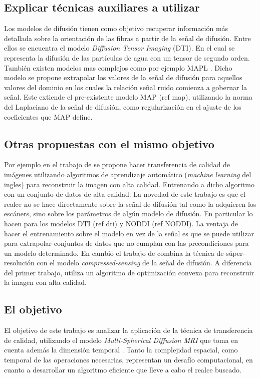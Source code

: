 \documentclass[a4paper,10pt]{article}
\begin{document}
\subsection{Explicar técnicas auxiliares a utilizar}
Los modelos de difusión tienen como objetivo recuperar información más detallada sobre la orientación de las fibras a 
partir de la señal de difusión. Entre ellos se encuentra el modelo \textit{Diffusion Tensor Imaging} (DTI). En el cual 
se representa la difusión de las partículas de agua con un tensor de segundo orden. También existen modelos mas 
complejos como por ejemplo MAPL \citep{Fick2016365}. Dicho modelo se propone extrapolar los 
valores de la se\~nal de difusión para aquellos valores del dominio en los cuales la relaci\'on 
se\~nal ruido comienza a gobernar la se\~nal. Este extiende el pre-existente modelo MAP (ref 
map), utilizando la norma del Laplaciano de la se\~nal de difusión, como regularizaci\'on en el 
ajuste de los coeficientes que MAP define.


\subsection{Otras propuestas con el mismo objetivo}
Por ejemplo en el trabajo de \citet{Alexander2014} se propone hacer transferencia de 
calidad de imágenes utilizando algoritmos de aprendizaje automático 
(\textit{machine learning} del ingles) para reconstruir la imagen con alta 
calidad. Entrenando a dicho algoritmo con un conjunto de datos de alta 
calidad. La novedad de este trabajo es que el realce no se hace directamente 
sobre la señal de difusión tal como la adquieren los escáners, sino sobre los 
parámetros de algún modelo de difusión. En particular lo hacen para los modelos DTI 
(ref dti) y NODDI (ref NODDI). La ventaja de hacer el entrenamiento sobre el modelo en vez de la 
se\~nal es que se puede utilizar para extrapolar conjuntos de datos que no cumplan con 
las precondiciones para un modelo determinado. En cambio el trabajo de \citet{Ning2016} combina la 
t\'ecnica de súper-resolución con el modelo \textit{compressed-sensing} \citep{Naidoo2015} de la señal de difusión. A 
diferencia del primer trabajo, utiliza un algoritmo de 
optimización convexa para reconstruir la imagen con alta calidad.

\subsection{El objetivo}
El objetivo de este trabajo es analizar la aplicación de la técnica de 
transferencia de calidad, utilizando el modelo \textit{Multi-Spherical Diffusion MRI} que toma en cuenta además 
la dimensión temporal \citep{Fick}. Tanto la complejidad espacial, como temporal de las 
operaciones necesarias, representan un desafío computacional, en cuanto a 
desarrollar un algoritmo eficiente que lleve a cabo el realce buscado.





\clearpage


\end{document}
